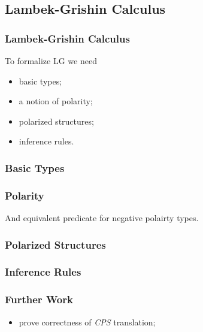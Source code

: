 \documentclass[utf8x]{beamer}
\begin{document}
\subsection{Lambek-Grishin Calculus}

\begin{frame}
\frametitle{Lambek-Grishin Calculus}

To formalize LG we need
\begin{itemize}
\item basic types;
\item a notion of polarity;
\item polarized structures;
\item inference rules.
\end{itemize}
\end{frame}

\begin{frame}
\frametitle{Basic Types}


\end{frame}

\begin{frame}
\frametitle{Polarity}


And equivalent predicate for negative polairty types.
\end{frame}

\begin{frame}
\frametitle{Polarized Structures}

\end{frame}

\begin{frame}
\frametitle{Inference Rules}






\end{frame}

\begin{frame}
\frametitle{Further Work}

\begin{itemize}
\item prove correctness of \emph{CPS} translation;
\end{itemize}
\end{frame}
\end{document}
